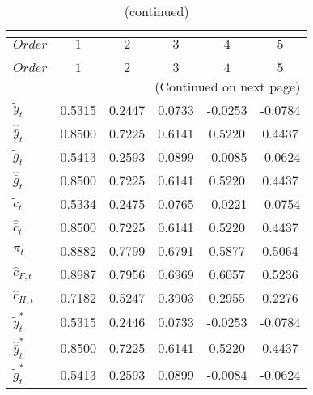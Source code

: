  
\begin{center}
\begin{longtable}{lccccc} 
\caption{COEFFICIENTS OF AUTOCORRELATION}\\
 \label{Table:th_autocorr_matrix}\\
\toprule 
$Order                $	 & 	 $         1$	 & 	 $         2$	 & 	 $         3$	 & 	 $         4$	 & 	 $         5$\\
\midrule \endfirsthead 
\caption{(continued)}\\
 \toprule \\ 
$Order                $	 & 	 $         1$	 & 	 $         2$	 & 	 $         3$	 & 	 $         4$	 & 	 $         5$\\
\midrule \endhead 
\midrule \multicolumn{6}{r}{(Continued on next page)} \\ \bottomrule \endfoot 
\bottomrule \endlastfoot 
${\tilde y_t}         $	 & 	    0.5315	 & 	    0.2447	 & 	    0.0733	 & 	   -0.0253	 & 	   -0.0784 \\ 
${\hat {\bar y}_t}    $	 & 	    0.8500	 & 	    0.7225	 & 	    0.6141	 & 	    0.5220	 & 	    0.4437 \\ 
${\tilde g_t}         $	 & 	    0.5413	 & 	    0.2593	 & 	    0.0899	 & 	   -0.0085	 & 	   -0.0624 \\ 
${\hat {\bar g}_t}    $	 & 	    0.8500	 & 	    0.7225	 & 	    0.6141	 & 	    0.5220	 & 	    0.4437 \\ 
${\tilde c_t}         $	 & 	    0.5334	 & 	    0.2475	 & 	    0.0765	 & 	   -0.0221	 & 	   -0.0754 \\ 
${\hat {\bar c}_t}    $	 & 	    0.8500	 & 	    0.7225	 & 	    0.6141	 & 	    0.5220	 & 	    0.4437 \\ 
${\pi_t}              $	 & 	    0.8882	 & 	    0.7799	 & 	    0.6791	 & 	    0.5877	 & 	    0.5064 \\ 
${\hat c_{F,t}}       $	 & 	    0.8987	 & 	    0.7956	 & 	    0.6969	 & 	    0.6057	 & 	    0.5236 \\ 
${\hat c_{H,t}}       $	 & 	    0.7182	 & 	    0.5247	 & 	    0.3903	 & 	    0.2955	 & 	    0.2276 \\ 
${\tilde y_t^*}       $	 & 	    0.5315	 & 	    0.2446	 & 	    0.0733	 & 	   -0.0253	 & 	   -0.0784 \\ 
${\hat {\bar y}_t^*}  $	 & 	    0.8500	 & 	    0.7225	 & 	    0.6141	 & 	    0.5220	 & 	    0.4437 \\ 
${\tilde g_t^*}       $	 & 	    0.5413	 & 	    0.2593	 & 	    0.0899	 & 	   -0.0084	 & 	   -0.0624 \\ 

\end{longtable}
\end{center}
